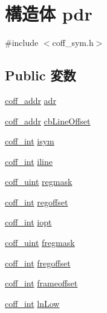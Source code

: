 \hypertarget{structpdr}{
\section{構造体 pdr}
\label{structpdr}
}


{\ttfamily \#include $<$coff\_\-sym.h$>$}\subsection*{Public 変数}
\begin{DoxyCompactItemize}
\item 
\hyperlink{ecoff__machdep_8h_a4fbfcee7b2a1d29c094364adc6423da0}{coff\_\-addr} \hyperlink{structpdr_aa107dae335462ef6611fd0f516d6a35a}{adr}
\item 
\hyperlink{ecoff__machdep_8h_a4fbfcee7b2a1d29c094364adc6423da0}{coff\_\-addr} \hyperlink{structpdr_a7332332a06749b52b7210069fc3f6179}{cbLineOffset}
\item 
\hyperlink{ecoff__machdep_8h_a484fbe8ab04f62e9ac2341a8275f3c35}{coff\_\-int} \hyperlink{structpdr_a5b41af4e0a780cc1f8537a1f5f9b1eba}{isym}
\item 
\hyperlink{ecoff__machdep_8h_a484fbe8ab04f62e9ac2341a8275f3c35}{coff\_\-int} \hyperlink{structpdr_ab6bc2a8522a807d9898c2893ba897780}{iline}
\item 
\hyperlink{ecoff__machdep_8h_ab38b7c66cf20051c3d7bb0f268d1e2a5}{coff\_\-uint} \hyperlink{structpdr_a483285303cfea098d3714bb87f10ffab}{regmask}
\item 
\hyperlink{ecoff__machdep_8h_a484fbe8ab04f62e9ac2341a8275f3c35}{coff\_\-int} \hyperlink{structpdr_a00dcff15b999ec73eec85e2ebc34a6a8}{regoffset}
\item 
\hyperlink{ecoff__machdep_8h_a484fbe8ab04f62e9ac2341a8275f3c35}{coff\_\-int} \hyperlink{structpdr_adae35f7dc77f3a3ca169d88e4e18f9ba}{iopt}
\item 
\hyperlink{ecoff__machdep_8h_ab38b7c66cf20051c3d7bb0f268d1e2a5}{coff\_\-uint} \hyperlink{structpdr_a58a11e19b67f422331fb0af81f0ab43f}{fregmask}
\item 
\hyperlink{ecoff__machdep_8h_a484fbe8ab04f62e9ac2341a8275f3c35}{coff\_\-int} \hyperlink{structpdr_a030ee23aa52f858174ec040e20bf5215}{fregoffset}
\item 
\hyperlink{ecoff__machdep_8h_a484fbe8ab04f62e9ac2341a8275f3c35}{coff\_\-int} \hyperlink{structpdr_ac31de955ea1a1fa7a31ecec0a8eae8ce}{frameoffset}
\item 
\hyperlink{ecoff__machdep_8h_a484fbe8ab04f62e9ac2341a8275f3c35}{coff\_\-int} \hyperlink{structpdr_a68834ef626d0d0eb5dfc40dc548bae73}{lnLow}

\end{DoxyCompactItemize}
